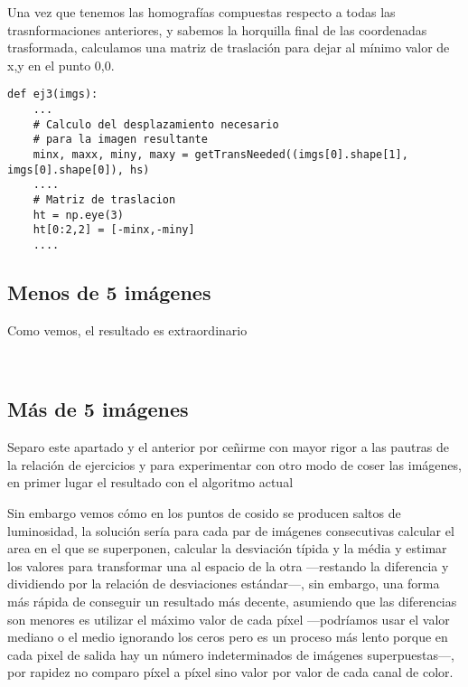 \documentclass{article}
\newcommand{\img}[2]{
\noindent\makebox[\textwidth][c]{\texttt{[image: \#1]}}%
}
\begin{document}
Una vez que tenemos las homografías compuestas respecto a todas las trasnformaciones anteriores, y sabemos la horquilla final de las coordenadas trasformada, calculamos una matriz de traslación para dejar al mínimo valor de x,y en el punto 0,0.

\begin{lstlisting}
def ej3(imgs):
    ...
    # Calculo del desplazamiento necesario
    # para la imagen resultante
    minx, maxx, miny, maxy = getTransNeeded((imgs[0].shape[1], imgs[0].shape[0]), hs)
    ....
    # Matriz de traslacion 
    ht = np.eye(3)
    ht[0:2,2] = [-minx,-miny]
	....
\end{lstlisting}

\subsection{Menos de 5 imágenes}

Como vemos, el resultado es extraordinario

\img{img/ej3_1}{1}
\\

\img{img/ej3_2}{1}

\subsection{Más de 5 imágenes}

Separo este apartado y el anterior por ceñirme con mayor rigor a las pautras de la relación de ejercicios y para experimentar con otro modo de coser las imágenes, en primer lugar el resultado con el algoritmo actual

\img{img/ej4_1}{1}

Sin embargo vemos cómo en los puntos de cosido se producen saltos de luminosidad, la solución sería para cada par de imágenes consecutivas calcular el area en el que se superponen, calcular la desviación típida y la média y estimar los valores para transformar una al espacio de la otra ---restando la diferencia y dividiendo por la relación de desviaciones estándar---, sin embargo, una forma más rápida de conseguir un resultado más decente, asumiendo que las diferencias son menores es utilizar el máximo valor de cada píxel ---podríamos usar el valor mediano o el medio ignorando los ceros pero es un proceso más lento porque en cada pixel de salida hay un número indeterminados de imágenes superpuestas---, por rapidez no comparo píxel a píxel sino valor por valor de cada canal de color.
\end{document}
